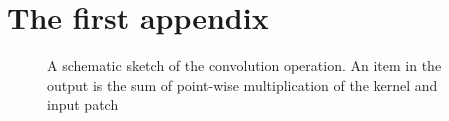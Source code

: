 \chapter{The first appendix}

 
 \begin{figure}[htb]
 	\centering
 	\epsfxsize=8cm
 	{}
 	\caption{A schematic sketch of the convolution operation. An item in the output is the sum of point-wise multiplication of the kernel and input patch \cite{bloggg}}
 	\label{fig:complexconv}
 \end{figure}
